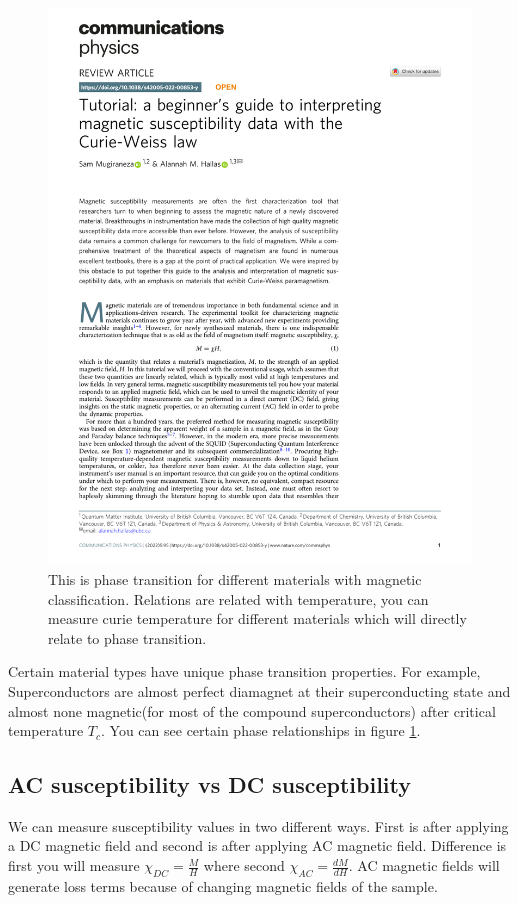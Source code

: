 \begin{figure}
\centering\includegraphics[width=\textwidth, page=5, trim={1cm 22cm 1cm 1.2cm}, clip ]{phasefig.pdf}
\caption{This is phase transition for different materials with magnetic classification. Relations are related with temperature, you can measure curie temperature for different materials which will directly relate to phase transition.}
\label{fig:phasefig}
\end{figure}

Certain material types have unique phase transition properties. For example, Superconductors are almost perfect diamagnet at their superconducting state and almost none magnetic(for most of the compound superconductors) after critical temperature $T_c$. You can see certain phase relationships in figure \ref{fig:phasefig}\cite{Mugiraneza2022}. 

\subsection{AC susceptibility vs DC susceptibility}
We can measure susceptibility values in two different ways. First is after applying a DC magnetic field and second is after applying AC magnetic field. Difference is first you will measure $\chi_{DC} = \frac{M}{H}$ where second $\chi_{AC} = \frac{dM}{dH}$.
AC magnetic fields will generate loss terms because of changing magnetic fields of the sample. 

